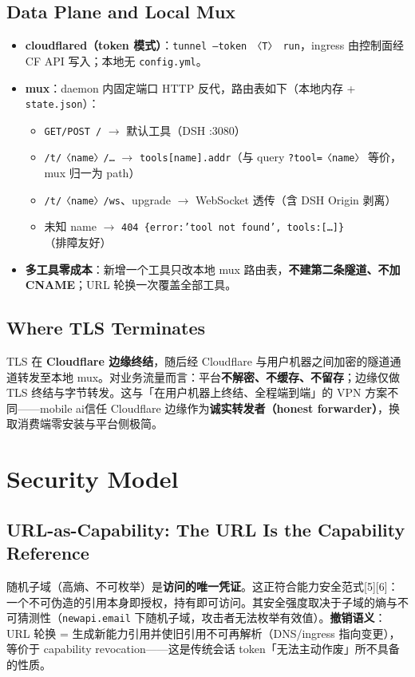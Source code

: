 \documentclass[10pt,a4paper]{article}
\newcommand{\sys}{mobile ai}
\begin{document}
\subsection{Data Plane and Local Mux}
\begin{itemize}[leftmargin=1.6em,itemsep=0.2em,topsep=0.2em]
  \item \textbf{cloudflared（token 模式）}：\texttt{tunnel --token 〈T〉 run}，ingress 由控制面经 CF API 写入；本地无 \texttt{config.yml}。
  \item \textbf{mux}：daemon 内固定端口 HTTP 反代，路由表如下（本地内存 + \texttt{state.json}）：
    \begin{itemize}[leftmargin=1.4em,itemsep=0.1em,topsep=0.2em]
      \item \texttt{GET/POST /} $\rightarrow$ 默认工具（DSH :3080）
      \item \texttt{/t/〈name〉/\ldots} $\rightarrow$ \texttt{tools[name].addr}（与 query \texttt{?tool=〈name〉} 等价，mux 归一为 path）
      \item \texttt{/t/〈name〉/ws}、upgrade $\rightarrow$ WebSocket 透传（含 DSH Origin 剥离）
      \item 未知 name $\rightarrow$ \texttt{404 \{error:'tool not found', tools:[\ldots]\}}（排障友好）
    \end{itemize}
  \item \textbf{多工具零成本}：新增一个工具只改本地 mux 路由表，\textbf{不建第二条隧道、不加 CNAME}；URL 轮换一次覆盖全部工具。
\end{itemize}

\subsection{Where TLS Terminates}
TLS 在 \textbf{Cloudflare 边缘终结}，随后经 Cloudflare 与用户机器之间加密的隧道通道转发至本地 mux。对业务流量而言：平台\textbf{不解密、不缓存、不留存}；边缘仅做 TLS 终结与字节转发。这与「在用户机器上终结、全程端到端」的 VPN 方案不同——\sys 信任 Cloudflare 边缘作为\textbf{诚实转发者（honest forwarder）}，换取消费端零安装与平台侧极简。

\section{Security Model}

\subsection{URL-as-Capability: The URL Is the Capability Reference}
随机子域（高熵、不可枚举）是\textbf{访问的唯一凭证}。这正符合能力安全范式[5][6]：一个不可伪造的引用本身即授权，持有即可访问。其安全强度取决于子域的熵与不可猜测性（\texttt{newapi.email} 下随机子域，攻击者无法枚举有效值）。\textbf{撤销语义}：URL 轮换 = 生成新能力引用并使旧引用不可再解析（DNS/ingress 指向变更），等价于 capability revocation——这是传统会话 token「无法主动作废」所不具备的性质。
\end{document}
